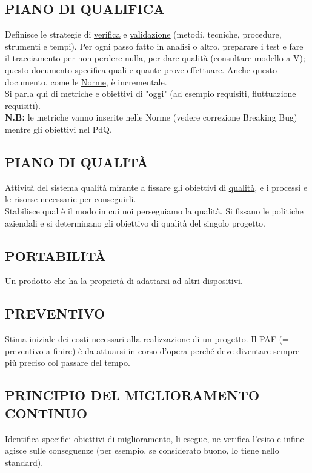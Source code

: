		\subsection{PIANO DI QUALIFICA}		\label{pianoqualifica}
		Definisce le strategie di \underline{\hyperref[verificare]{verifica}} e \underline{\hyperref[validare]{validazione}} (metodi, tecniche, procedure, strumenti e tempi). Per ogni passo fatto in analisi o altro, preparare i test e fare il tracciamento per non perdere nulla, per dare qualità (consultare \underline{\hyperref[V]{modello a V}}); questo documento specifica quali e quante prove effettuare. Anche questo documento, come le \underline{\hyperref[norme]{Norme}}, è incrementale. \\
		Si parla qui di metriche e obiettivi di "oggi" (ad esempio requisiti, fluttuazione requisiti). \\
		\textbf{N.B:} le metriche vanno inserite nelle Norme (vedere correzione Breaking Bug) mentre gli obiettivi nel PdQ.


		\subsection{PIANO DI QUALITÀ}		\label{pianoqualita} %
		Attività del sistema qualità mirante a fissare gli obiettivi di \underline{\hyperref[qualita]{qualità}}, e i processi e le risorse necessarie per conseguirli. \\
		Stabilisce qual è il modo in cui noi perseguiamo la qualità. Si fissano le politiche aziendali e si determinano gli obiettivo di qualità del singolo progetto.


		\subsection{PORTABILITÀ}		\label{portabilita}
		Un prodotto che ha la proprietà di adattarsi ad altri dispositivi.


		\subsection{PREVENTIVO}  \label{preventivo}
		Stima iniziale dei costi necessari alla realizzazione di un \underline{\hyperref[progetto]{progetto}}.
		Il PAF (= preventivo a finire) è da attuarsi in corso d'opera perché deve diventare sempre più preciso col passare del tempo.


		\subsection{PRINCIPIO DEL MIGLIORAMENTO CONTINUO}  \label{miglioramentocontinuo}
		Identifica specifici obiettivi di miglioramento, li esegue, ne verifica l'esito e infine agisce sulle conseguenze (per esempio, se considerato buono, lo tiene nello standard).


